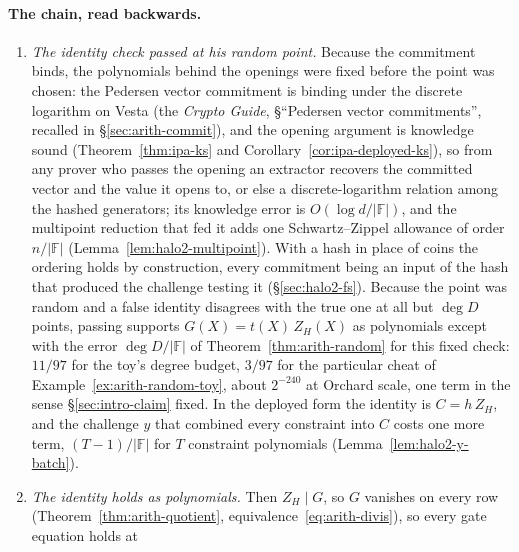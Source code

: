 \documentclass[11pt,a4paper]{article}
\theoremstyle{definition}
\newcommand{\F}{\mathbb{F}}
\newcommand{\ZH}{Z_H}
\begin{document}
\paragraph{The chain, read backwards.}
\begin{enumerate}[leftmargin=*, itemsep=3pt]
\item \emph{The identity check passed at his random point.} Because the
  commitment binds, the polynomials behind the openings were fixed
  before the point was chosen: the Pedersen vector commitment is
  binding under the discrete logarithm on Vesta (the \emph{Crypto
  Guide}, \S``Pedersen vector commitments'', recalled in
  \S\ref{sec:arith-commit}), and the opening argument is knowledge
  sound (Theorem~\ref{thm:ipa-ks} and
  Corollary~\ref{cor:ipa-deployed-ks}), so from any prover who passes the
  opening an extractor recovers the committed vector and the value it
  opens to, or else a discrete-logarithm relation among the hashed
  generators; its knowledge error is $O(\log d/|\F|)$, and the
  multipoint reduction that fed it adds one Schwartz--Zippel allowance
  of order $n/|\F|$ (Lemma~\ref{lem:halo2-multipoint}). With a
  hash in place of coins the ordering holds by construction, every
  commitment being an input of the hash that produced the challenge
  testing it (\S\ref{sec:halo2-fs}). Because the point was random and a
  false identity disagrees with the true one at all but $\deg D$
  points, passing supports $G(X) = t(X)\,\ZH(X)$ as polynomials except
  with the error $\deg D/|\F|$ of Theorem~\ref{thm:arith-random} for
  this fixed check:
  $11/97$ for the toy's degree budget, $3/97$ for the particular cheat
  of Example~\ref{ex:arith-random-toy}, about $2^{-240}$ at Orchard
  scale, one term in the sense \S\ref{sec:intro-claim} fixed. In the
  deployed form the identity is $C = h\,\ZH$, and the challenge $y$
  that combined every constraint into $C$ costs one more term,
  $(T - 1)/|\F|$ for $T$ constraint polynomials
  (Lemma~\ref{lem:halo2-y-batch}).
\item \emph{The identity holds as polynomials.} Then $\ZH \mid G$, so
  $G$ vanishes on every row (Theorem~\ref{thm:arith-quotient},
  equivalence~\eqref{eq:arith-divis}), so every gate equation holds at

\end{enumerate}
\end{document}
